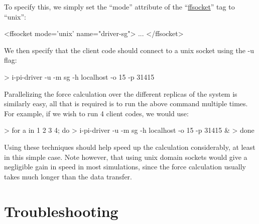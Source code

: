 \documentclass[11pt,english,fleqn]{report}
\newenvironment{code}{%
\footnotesize 
\verbatim
}{
\endverbatim
\normalsize
}
\begin{document}
To specify this, we simply set the {}``mode'' attribute of the
{}``\hyperref[FFSOCKET]{ffsocket}'' tag to {}``unix'':

\begin{code}
<ffsocket mode='unix' name="driver-sg">
   ...
</ffsocket>
\end{code}

We then specify that the client code should connect to a unix socket
using the -u flag:

\begin{code}
> i-pi-driver -u -m sg -h localhost -o 15 -p 31415
\end{code}

Parallelizing the force calculation over the different replicas of the system
is similarly easy, all that is required is to run the above
command multiple times. For example, if we wish to run
4 client codes, we would use:

\begin{code}
> for a in 1 2 3 4; do
>    i-pi-driver -u -m sg -h localhost -o 15 -p 31415 &
> done
\end{code}

Using these techniques should help speed up the calculation considerably,
at least in this simple case. Note however, that using unix domain sockets
would give a negligible gain in speed in most simulations, 
since the force calculation usually takes much longer than the data transfer. 

\chapter{Troubleshooting}

\label{trouble}
\end{document}
